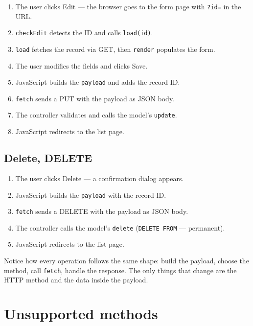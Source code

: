 \documentclass[11pt,a4paper,oneside]{book}
\providecommand{\tightlist}{%
  \setlength{\itemsep}{0pt}\setlength{\parskip}{0pt}}
\begin{document}
\begin{enumerate}
\def\labelenumi{\arabic{enumi}.}
\tightlist
\item
  The user clicks Edit --- the browser goes to the form page with
  \texttt{?id=} in the URL.
\item
  \texttt{checkEdit} detects the ID and calls \texttt{load(id)}.
\item
  \texttt{load} fetches the record via GET, then \texttt{render}
  populates the form.
\item
  The user modifies the fields and clicks Save.
\item
  JavaScript builds the \texttt{payload} and adds the record ID.
\item
  \texttt{fetch} sends a PUT with the payload as JSON body.
\item
  The controller validates and calls the model's \texttt{update}.
\item
  JavaScript redirects to the list page.
\end{enumerate}

\hypertarget{delete-delete}{%
\subsection{Delete, DELETE}\label{delete-delete}}

\begin{enumerate}
\def\labelenumi{\arabic{enumi}.}
\tightlist
\item
  The user clicks Delete --- a confirmation dialog appears.
\item
  JavaScript builds the \texttt{payload} with the record ID.
\item
  \texttt{fetch} sends a DELETE with the payload as JSON body.
\item
  The controller calls the model's \texttt{delete}
  (\texttt{DELETE\ FROM} --- permanent).
\item
  JavaScript redirects to the list page.
\end{enumerate}

Notice how every operation follows the same shape: build the
payload, choose the method, call \texttt{fetch}, handle the
response. The only things that change are the HTTP method and the
data inside the payload.

\hypertarget{unsupported-methods}{%
\section{Unsupported methods}\label{unsupported-methods}}
\end{document}

